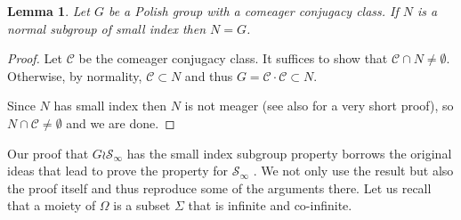 \documentclass[JEP,XML,SOM,Unicode,NoFloatCountersInSection]{cedram}
\let\mathcal\mathscr
\theoremstyle{plain}
\newtheorem{lem}[thm]{Lemma}
\theoremstyle{definition}
\newcommand{\cC}{\mathcal{C}}
\newcommand{\cS}{\mathcal{S}}
\newcommand{\sinf}{\cS_\infty}
\begin{document}
\begin{lem}\label{nsi} Let $G$ be a Polish group with a comeager conjugacy class. If $N$ is a normal subgroup of small index then $N=G$.
\end{lem}

\begin{proof}Let $\cC$ be the comeager conjugacy class. It suffices to show that $\cC\cap N\neq\emptyset$. Otherwise, by normality, $\cC\subset N$ and thus $G=\cC\cdot\cC\subset N$.

Since $N$ has small index then $N$ is not meager \cite[Th.\,4.1]{MR1231710} (see also \cite[Lem.\,6.8]{Kechris-Rosendal} for a very short proof), so $N\cap\cC\neq\emptyset$ and we are done.\end{proof}

Our proof that $G\wr\sinf$ has the small index subgroup property borrows the original ideas that lead to prove the property for $\sinf$ \cite[Th.\,1]{MR859950}. We not only use the result but also the proof itself and thus reproduce some of the arguments there. Let us recall that a moiety of $\Omega$ is a subset $\Sigma$ that is infinite and co-infinite.
\end{document}

